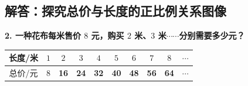﻿%

\subsection{解答：探究总价与长度的正比例关系图像}

\vspace{0.6cm}

\noindent\textbf{2. 一种花布每米售价 $8$ 元，购买 $2$ 米、$3$ 米$\cdots\cdots$分别需要多少元？}

\vspace{0.3cm}
\begin{center}
\renewcommand{\arraystretch}{1.5}
\begin{tabular}{|c|c|c|c|c|c|c|c|c|c|}
\hline
长度/米 & $1$ & $2$ & $3$ & $4$ & $5$ & $6$ & $7$ & $8$ & $\cdots$ \\
\hline
总价/元 & $8$ 
  & \textcolor{blue!80!black}{\textbf{16}}
  & \textcolor{blue!80!black}{\textbf{24}}
  & \textcolor{blue!80!black}{\textbf{32}}
  & \textcolor{blue!80!black}{\textbf{40}}
  & \textcolor{blue!80!black}{\textbf{48}}
  & \textcolor{blue!80!black}{\textbf{56}}
  & \textcolor{blue!80!black}{\textbf{64}}
  & $\cdots$ \\
\hline
\end{tabular}
\end{center}

\vspace{0.6cm}

